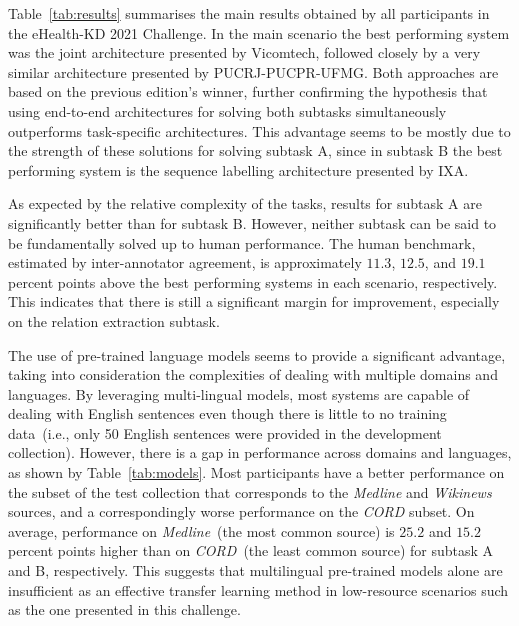 \documentclass[a4paper,11pt,twocolumn,twoside]{article}
\begin{document}
Table~\ref{tab:results} summarises the main results obtained by all participants in the eHealth-KD 2021 Challenge.
In the main scenario the best performing system was the joint architecture presented by Vicomtech, followed closely by a very similar architecture presented by PUCRJ-PUCPR-UFMG.
Both approaches are based on the previous edition's winner, further confirming the hypothesis that using end-to-end architectures for solving both subtasks simultaneously outperforms task-specific architectures.
This advantage seems to be mostly due to the strength of these solutions for solving subtask A, since in subtask B the best performing system is the sequence labelling architecture presented by IXA.

As expected by the relative complexity of the tasks, results for subtask A are significantly better than for subtask B.
However, neither subtask can be said to be fundamentally solved up to human performance.
The human benchmark, estimated by inter-annotator agreement, is approximately $11.3$,
$12.5$, and $19.1$ percent points above the best performing systems in each scenario, respectively.
This indicates that there is still a significant margin for improvement, especially on the relation extraction subtask.

The use of pre-trained language models seems to provide a significant advantage, taking into consideration the complexities of dealing with multiple domains and languages.
By leveraging multi-lingual models, most systems are capable of dealing with English sentences even though there is little to no training data~(i.e., only 50 English sentences were provided in the development collection).
However, there is a gap in performance across domains and languages, as shown by Table~\ref{tab:models}.
Most participants have a better performance on the subset of the test collection that corresponds to the \textit{Medline} and \textit{Wikinews} sources, and a correspondingly worse performance on the \textit{CORD} subset.
On average, performance on \textit{Medline}~(the most common source) is $25.2$ and $15.2$ percent points higher than on \textit{CORD}~(the least common source) for subtask A and B, respectively.
This suggests that multilingual pre-trained models alone are insufficient as an effective transfer learning method in low-resource scenarios such as the one presented in this challenge.
\end{document}
